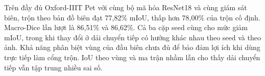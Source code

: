 Trên đầy đủ Oxford-IIIT Pet với cùng bộ mã hóa ResNet18 và cùng giám sát biên, trộn theo bản đồ biên đạt 77,82\% mIoU, thấp hơn 78,00\% của trộn cố định. Macro-Dice lần lượt là 86,51\% và 86,62\%. Cả ba cặp seed cùng cho mức giảm mIoU, trong khi thay đổi ở dải chuyển tiếp có hướng khác nhau theo seed và theo ảnh. Khả năng phân biệt vùng của đầu biên chưa đủ để bảo đảm lợi ích khi dùng trực tiếp làm cổng trộn. IoU theo vùng và ma trận nhầm lẫn cho thấy dải chuyển tiếp vẫn tập trung nhiều sai số.
